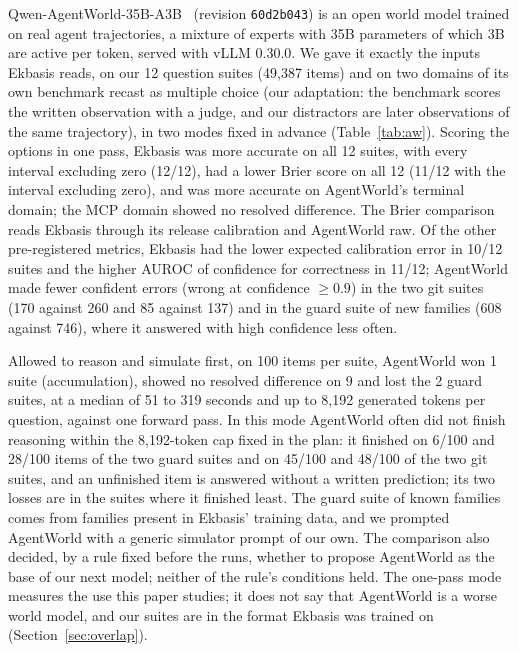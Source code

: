\documentclass[11pt]{article}
\begin{document}
Qwen-AgentWorld-35B-A3B~\cite{zuo2026agentworld,qwenagentworldmodel} (revision \texttt{60d2b043}) is an open world model
trained on real agent trajectories, a mixture of experts with 35B parameters of which 3B are active per token, served
with vLLM 0.30.0. We gave it exactly the inputs Ekbasis reads, on our 12 question suites (49,387 items) and on two domains
of its own benchmark recast as multiple choice (our adaptation: the benchmark scores the written observation with a
judge, and our distractors are later observations of the same trajectory), in two modes fixed in advance
(Table~\ref{tab:aw}). Scoring the options in one pass, Ekbasis was more accurate on all 12 suites, with every interval
excluding zero (12/12), had a lower Brier score on all 12 (11/12 with the interval excluding zero), and was more accurate
on AgentWorld's terminal domain; the MCP domain showed no resolved difference. The Brier comparison reads Ekbasis through
its release calibration and AgentWorld raw. Of the other pre-registered metrics, Ekbasis had the lower expected
calibration error in 10/12 suites and the higher AUROC of confidence for correctness in 11/12; AgentWorld made fewer
confident errors (wrong at confidence $\ge 0.9$) in the two git suites (170 against 260 and 85 against 137) and in the
guard suite of new families (608 against 746), where it answered with high confidence less often.

Allowed to reason and simulate first, on 100 items per suite, AgentWorld won 1 suite (accumulation), showed no resolved
difference on 9 and lost the 2 guard suites, at a median of 51 to 319 seconds and up to 8,192 generated tokens per
question, against one forward pass. In this mode AgentWorld often did not finish reasoning within the 8,192-token cap
fixed in the plan: it finished on 6/100 and 28/100 items of the two guard suites and on 45/100 and 48/100 of the two git
suites, and an unfinished item is answered without a written prediction; its two losses are in the suites where it
finished least. The guard suite of known families comes from families present in Ekbasis' training data, and we prompted
AgentWorld with a generic simulator prompt of our own. The comparison also decided, by a rule fixed before the runs,
whether to propose AgentWorld as the base of our next model; neither of the rule's conditions held. The one-pass mode
measures the use this paper studies; it does not say that AgentWorld is a worse world model, and our suites are in the
format Ekbasis was trained on (Section~\ref{sec:overlap}).
\end{document}
